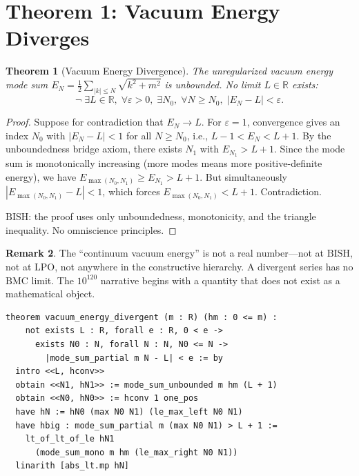 \documentclass[11pt,a4paper]{article}
\theoremstyle{plain}
\newtheorem{theorem}{Theorem}[section]
\theoremstyle{definition}
\newtheorem{remark}[theorem]{Remark}
\newcommand{\RR}{\mathbb{R}}
\newcommand{\LPO}{\ensuremath{\mathrm{LPO}}}
\newcommand{\BISH}{\ensuremath{\mathrm{BISH}}}
\newcommand{\BMC}{\ensuremath{\mathrm{BMC}}}
\begin{document}
\section{Theorem 1: Vacuum Energy Diverges}\label{sec:diverge}

\begin{theorem}[Vacuum Energy Divergence]\label{thm:diverge}
The unregularized vacuum energy mode sum $E_N = \frac{1}{2}\sum_{|k|\leq N}
\sqrt{k^2 + m^2}$ is unbounded.  No limit $L \in \RR$ exists:
\[
  \neg\; \exists L \in \RR,\; \forall \varepsilon > 0,\;
  \exists N_0,\; \forall N \geq N_0,\;
  |E_N - L| < \varepsilon.
\]
\end{theorem}

\begin{proof}
Suppose for contradiction that $E_N \to L$.  For $\varepsilon = 1$,
convergence gives an index $N_0$ with $|E_N - L| < 1$ for all $N \geq N_0$,
i.e., $L - 1 < E_N < L + 1$.
By the unboundedness bridge axiom, there exists $N_1$ with
$E_{N_1} > L + 1$.  Since the mode sum is monotonically increasing
(more modes means more positive-definite energy), we have
$E_{\max(N_0, N_1)} \geq E_{N_1} > L + 1$.
But simultaneously $|E_{\max(N_0, N_1)} - L| < 1$, which forces
$E_{\max(N_0, N_1)} < L + 1$.  Contradiction.

$\BISH$: the proof uses only unboundedness, monotonicity, and
the triangle inequality.  No omniscience principles.
\end{proof}

\begin{remark}
The ``continuum vacuum energy'' is not a real number---not at
$\BISH$, not at $\LPO$, not anywhere in the constructive hierarchy.
A divergent series has no $\BMC$ limit.  The $10^{120}$ narrative
begins with a quantity that does not exist as a mathematical object.
\end{remark}

\begin{lstlisting}[caption={Vacuum energy divergence: \texttt{VacuumDivergence.lean}}]
theorem vacuum_energy_divergent (m : R) (hm : 0 <= m) :
    not exists L : R, forall e : R, 0 < e ->
      exists N0 : N, forall N : N, N0 <= N ->
        |mode_sum_partial m N - L| < e := by
  intro <<L, hconv>>
  obtain <<N1, hN1>> := mode_sum_unbounded m hm (L + 1)
  obtain <<N0, hN0>> := hconv 1 one_pos
  have hN := hN0 (max N0 N1) (le_max_left N0 N1)
  have hbig : mode_sum_partial m (max N0 N1) > L + 1 :=
    lt_of_lt_of_le hN1
      (mode_sum_mono m hm (le_max_right N0 N1))
  linarith [abs_lt.mp hN]
\end{lstlisting}
\end{document}
